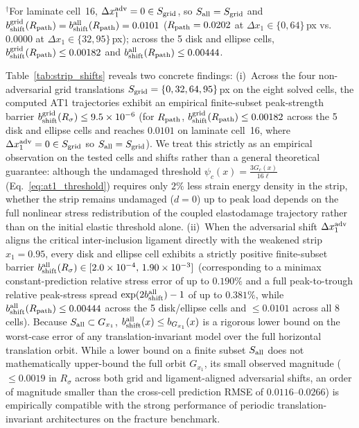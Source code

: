 \documentclass[preprint,11pt,a4paper]{elsarticle}
\begin{document}
\begin{table}[ht!]
{\begin{tabular}{rlccccccc}
\bottomrule
\end{tabular}%
}
\par\smallskip\raggedright{\footnotesize $^\dagger$For laminate cell~16, $\Delta x_1^{\rm adv}=0\in S_{\rm grid}$, so $S_{\rm all}=S_{\rm grid}$ and $b_{\rm shift}^{\rm grid}(R_{\rm path})=b_{\rm shift}^{\rm all}(R_{\rm path})=0.0101$ ($R_{\rm path}=0.0202$ at $\Delta x_1\in\{0,64\}$\,px vs.\ $0.0000$ at $\Delta x_1\in\{32,95\}$\,px); across the 5 disk and ellipse cells, $b_{\rm shift}^{\rm grid}(R_{\rm path})\le 0.00182$ and $b_{\rm shift}^{\rm all}(R_{\rm path})\le 0.00444$.}
\end{table}

Table~\ref{tab:strip_shifts} reveals two concrete findings:
(i)~Across the four non-adversarial grid translations $S_{\rm grid}=\{0,32,64,95\}$\,px on the eight solved cells, the computed AT1 trajectories exhibit an empirical finite-subset peak-strength barrier $b_{\rm shift}^{\rm grid}(R_\sigma)\le 9.5\times 10^{-6}$ (for $R_{\rm path}$, $b_{\rm shift}^{\rm grid}(R_{\rm path})\le 0.00182$ across the 5 disk and ellipse cells and reaches $0.0101$ on laminate cell~16, where $\Delta x_1^{\rm adv}=0\in S_{\rm grid}$ so $S_{\rm all}=S_{\rm grid}$). We treat this strictly as an empirical observation on the tested cells and shifts rather than a general theoretical guarantee: although the undamaged threshold $\psi_c(x)=\frac{3G_c(x)}{16\ell}$ (Eq.~\eqref{eq:at1_threshold}) requires only $2\%$ less strain energy density in the strip, whether the strip remains undamaged ($d=0$) up to peak load depends on the full nonlinear stress redistribution of the coupled elastodamage trajectory rather than on the initial elastic threshold alone.
(ii)~When the adversarial shift $\Delta x_1^{\rm adv}$ aligns the critical inter-inclusion ligament directly with the weakened strip $x_1=0.95$, every disk and ellipse cell exhibits a strictly positive finite-subset barrier $b_{\rm shift}^{\rm all}(R_\sigma)\in[2.0\times 10^{-4},\,1.90\times 10^{-3}]$ (corresponding to a minimax constant-prediction relative stress error of up to $0.190\%$ and a full peak-to-trough relative peak-stress spread $\exp(2b_{\rm shift}^{\rm all})-1$ of up to $0.381\%$, while $b_{\rm shift}^{\rm all}(R_{\rm path})\le 0.00444$ across the 5 disk/ellipse cells and $\le 0.0101$ across all 8 cells). Because $S_{\rm all}\subset G_{x_1}$, $b_{\rm shift}^{\rm all}(x)\le b_{G_{x_1}}(x)$ is a rigorous lower bound on the worst-case error of any translation-invariant model over the full horizontal translation orbit. While a lower bound on a finite subset $S_{\rm all}$ does not mathematically upper-bound the full orbit $G_{x_1}$, its small observed magnitude ($\le 0.0019$ in $R_\sigma$ across both grid and ligament-aligned adversarial shifts, an order of magnitude smaller than the cross-cell prediction RMSE of $0.0116\text{--}0.0266$) is empirically compatible with the strong performance of periodic translation-invariant architectures on the fracture benchmark.
\end{document}

